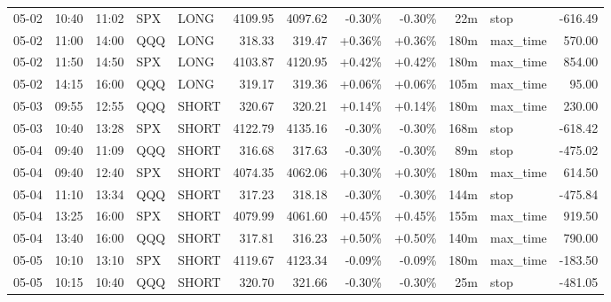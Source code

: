 \documentclass[11pt,a4paper,twoside]{article}
\begin{document}
\begin{center}
\begin{longtable}{>{\color{txtmain}}l l l l l r r r r r >{\color{txtmain}}l r}
05-02 & 10:40 & 11:02 & SPX & LONG & 4109.95 & 4097.62 & \textcolor{lossred}{-0.30\%} & \textcolor{lossred}{-0.30\%} & 22m & stop & \textcolor{lossred}{-616.49} \\
05-02 & 11:00 & 14:00 & QQQ & LONG & 318.33 & 319.47 & \textcolor{wingreen}{+0.36\%} & \textcolor{wingreen}{+0.36\%} & 180m & max\_time & \textcolor{wingreen}{570.00} \\
05-02 & 11:50 & 14:50 & SPX & LONG & 4103.87 & 4120.95 & \textcolor{wingreen}{+0.42\%} & \textcolor{wingreen}{+0.42\%} & 180m & max\_time & \textcolor{wingreen}{854.00} \\
05-02 & 14:15 & 16:00 & QQQ & LONG & 319.17 & 319.36 & \textcolor{wingreen}{+0.06\%} & \textcolor{wingreen}{+0.06\%} & 105m & max\_time & \textcolor{wingreen}{95.00} \\
05-03 & 09:55 & 12:55 & QQQ & SHORT & 320.67 & 320.21 & \textcolor{wingreen}{+0.14\%} & \textcolor{wingreen}{+0.14\%} & 180m & max\_time & \textcolor{wingreen}{230.00} \\
05-03 & 10:40 & 13:28 & SPX & SHORT & 4122.79 & 4135.16 & \textcolor{lossred}{-0.30\%} & \textcolor{lossred}{-0.30\%} & 168m & stop & \textcolor{lossred}{-618.42} \\
05-04 & 09:40 & 11:09 & QQQ & SHORT & 316.68 & 317.63 & \textcolor{lossred}{-0.30\%} & \textcolor{lossred}{-0.30\%} & 89m & stop & \textcolor{lossred}{-475.02} \\
05-04 & 09:40 & 12:40 & SPX & SHORT & 4074.35 & 4062.06 & \textcolor{wingreen}{+0.30\%} & \textcolor{wingreen}{+0.30\%} & 180m & max\_time & \textcolor{wingreen}{614.50} \\
05-04 & 11:10 & 13:34 & QQQ & SHORT & 317.23 & 318.18 & \textcolor{lossred}{-0.30\%} & \textcolor{lossred}{-0.30\%} & 144m & stop & \textcolor{lossred}{-475.84} \\
05-04 & 13:25 & 16:00 & SPX & SHORT & 4079.99 & 4061.60 & \textcolor{wingreen}{+0.45\%} & \textcolor{wingreen}{+0.45\%} & 155m & max\_time & \textcolor{wingreen}{919.50} \\
05-04 & 13:40 & 16:00 & QQQ & SHORT & 317.81 & 316.23 & \textcolor{wingreen}{+0.50\%} & \textcolor{wingreen}{+0.50\%} & 140m & max\_time & \textcolor{wingreen}{790.00} \\
05-05 & 10:10 & 13:10 & SPX & SHORT & 4119.67 & 4123.34 & \textcolor{lossred}{-0.09\%} & \textcolor{lossred}{-0.09\%} & 180m & max\_time & \textcolor{lossred}{-183.50} \\
05-05 & 10:15 & 10:40 & QQQ & SHORT & 320.70 & 321.66 & \textcolor{lossred}{-0.30\%} & \textcolor{lossred}{-0.30\%} & 25m & stop & \textcolor{lossred}{-481.05} \\

\end{longtable}
\end{center}
\end{document}
